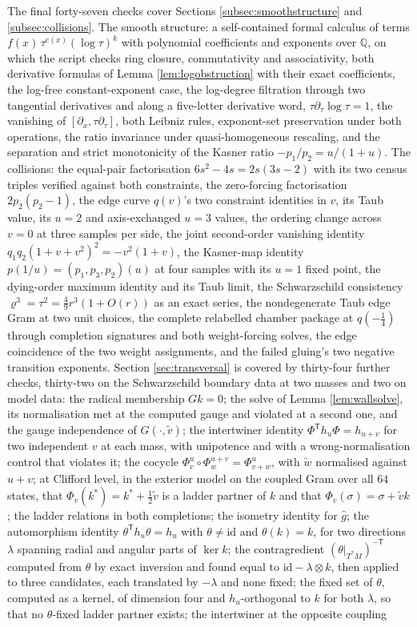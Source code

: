 \documentclass[11pt]{article}
\theoremstyle{definition}
\newcommand{\id}{\mathrm{id}}
\begin{document}
The final forty-seven checks cover Sections \ref{subsec:smoothstructure} and \ref{subsec:collisions}. The smooth structure: a self-contained formal calculus of terms $f(x)\,\tau^{e(x)}(\log\tau)^k$ with polynomial coefficients and exponents over $\mathbb{Q}$, on which the script checks ring closure, commutativity and associativity, both derivative formulas of Lemma \ref{lem:logobstruction} with their exact coefficients, the log-free constant-exponent case, the log-degree filtration through two tangential derivatives and along a five-letter derivative word, $\tau\partial_\tau\log\tau = 1$, the vanishing of $[\partial_x, \tau\partial_\tau]$, both Leibniz rules, exponent-set preservation under both operations, the ratio invariance under quasi-homogeneous rescaling, and the separation and strict monotonicity of the Kasner ratio $-p_1/p_2 = u/(1+u)$. The collisions: the equal-pair factorisation $6s^2-4s = 2s(3s-2)$ with its two census triples verified against both constraints, the zero-forcing factorisation $2p_2(p_2-1)$, the edge curve $q(v)$'s two constraint identities in $v$, its Taub value, its $u=2$ and axis-exchanged $u=3$ values, the ordering change across $v=0$ at three samples per side, the joint second-order vanishing identity $q_1q_2(1+v+v^2)^2 = -v^2(1+v)$, the Kasner-map identity $p(1/u) = (p_1,p_3,p_2)(u)$ at four samples with its $u=1$ fixed point, the dying-order maximum identity and its Taub limit, the Schwarzschild consistency $\varrho^3 = \tau^2 = \tfrac49 r^3(1+O(r))$ as an exact series, the nondegenerate Taub edge Gram at two unit choices, the complete relabelled chamber package at $q(-\tfrac14)$ through completion signatures and both weight-forcing solves, the edge coincidence of the two weight assignments, and the failed gluing's two negative transition exponents. Section \ref{sec:transversal} is covered by thirty-four further checks, thirty-two on the Schwarzschild boundary data at two masses and two on model data: the radical membership $Gk = 0$; the solve of Lemma \ref{lem:wallsolve}, its normalisation met at the computed gauge and violated at a second one, and the gauge independence of $G(\cdot, \tilde v)$; the intertwiner identity $\Phi^{\mathsf{T}} h_u \Phi = h_{u+v}$ for two independent $v$ at each mass, with unipotence and with a wrong-normalisation control that violates it; the cocycle $\Phi^u_v \circ \Phi^{u+v}_w = \Phi^u_{v+w}$, with $\tilde w$ normalised against $u + v$; at Clifford level, in the exterior model on the coupled Gram over all $64$ states, that $\Phi_v(k^*) = k^* + \tfrac12\tilde v$ is a ladder partner of $k$ and that $\Phi_v(\sigma) = \sigma + \tilde v k$; the ladder relations in both completions; the isometry identity for $\hat g$; the automorphism identity $\theta^{\mathsf{T}} h_u \theta = h_u$ with $\theta \neq \id$ and $\theta(k) = k$, for two directions $\lambda$ spanning radial and angular parts of $\ker k$; the contragredient $(\theta|_{T^*M})^{-\mathsf{T}}$ computed from $\theta$ by exact inversion and found equal to $\id - \lambda \otimes k$, then applied to three candidates, each translated by $-\lambda$ and none fixed; the fixed set of $\theta$, computed as a kernel, of dimension four and $h_u$-orthogonal to $k$ for both $\lambda$, so that no $\theta$-fixed ladder partner exists; the intertwiner at the opposite coupling 
\end{document}
